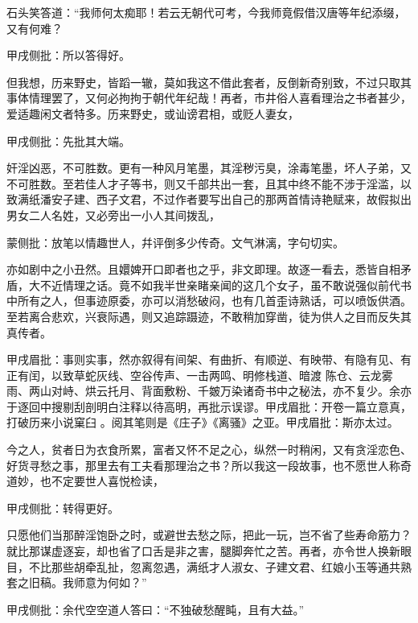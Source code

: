 \begin{parag}
    石头笑答道：“我师何太痴耶！若云无朝代可考，今我师竟假借汉唐等年纪添缀，又有何难？\begin{note}甲戌侧批：所以答得好。\end{note}但我想，历来野史，皆蹈一辙，莫如我这不借此套者，反倒新奇别致，不过只取其事体情理罢了，又何必拘拘于朝代年纪哉！再者，市井俗人喜看理治之书者甚少，爱适趣闲文者特多。历来野史，或讪谤君相，或贬人妻女，\begin{note}甲戌侧批：先批其大端。\end{note}奸淫凶恶，不可胜数。更有一种风月笔墨，其淫秽污臭，涂毒笔墨，坏人子弟，又不可胜数。至若佳人才子等书，则又千部共出一套，且其中终不能不涉于淫滥，以致满纸潘安子建、西子文君，不过作者要写出自己的那两首情诗艳赋来，故假拟出男女二人名姓，又必旁出一小人其间拨乱，\begin{note}蒙侧批：放笔以情趣世人，幷评倒多少传奇。文气淋漓，字句切实。\end{note}亦如剧中之小丑然。且嬛婢开口即者也之乎，非文即理。故逐一看去，悉皆自相矛盾，大不近情理之话。竟不如我半世亲睹亲闻的这几个女子，虽不敢说强似前代书中所有之人，但事迹原委，亦可以消愁破闷，也有几首歪诗熟话，可以喷饭供酒。至若离合悲欢，兴衰际遇，则又追踪蹑迹，不敢稍加穿凿，徒为供人之目而反失其真传者。\begin{note}甲戌眉批：事则实事，然亦叙得有间架、有曲折、有顺逆、有映带、有隐有见、有正有闰，以致草蛇灰线、空谷传声、一击两鸣、明修栈道、暗渡 陈仓、云龙雾雨、两山对峙、烘云托月、背面敷粉、千皴万染诸奇书中之秘法，亦不复少。余亦于逐回中搜剔刮剖明白注释以待高明，再批示误谬。甲戌眉批：开卷一篇立意真，打破历来小说窠臼 。阅其笔则是《庄子》《离骚》之亚。甲戌眉批：斯亦太过。\end{note}今之人，贫者日为衣食所累，富者又怀不足之心，纵然一时稍闲，又有贪淫恋色、好货寻愁之事，那里去有工夫看那理治之书？所以我这一段故事，也不愿世人称奇道妙，也不定要世人喜悦检读，\begin{note}甲戌侧批：转得更好。\end{note}只愿他们当那醉淫饱卧之时，或避世去愁之际，把此一玩，岂不省了些寿命筋力？就比那谋虚逐妄，却也省了口舌是非之害，腿脚奔忙之苦。再者，亦令世人换新眼目，不比那些胡牵乱扯，忽离忽遇，满纸才人淑女、子建文君、红娘小玉等通共熟套之旧稿。我师意为何如？”\begin{note}甲戌侧批：余代空空道人答曰：“不独破愁醒盹，且有大益。”\end{note}
\end{parag}


